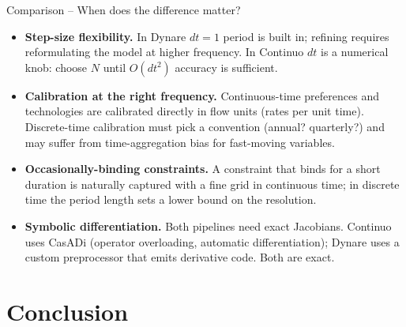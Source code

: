 \documentclass[11pt,aspectratio=169]{beamer}
\begin{document}
\begin{frame}{Comparison -- When does the difference matter?}

\begin{itemize}

\item \textbf{Step-size flexibility.} In Dynare $dt=1$ period is
  built in; refining requires reformulating the model at higher
  frequency. In Continuo $dt$ is a numerical knob: choose
  $N$ until $O(dt^2)$ accuracy is sufficient.\newline

\item \textbf{Calibration at the right frequency.} Continuous-time
  preferences and technologies are calibrated directly in flow units
  (rates per unit time). Discrete-time calibration must pick a
  convention (annual? quarterly?) and may suffer from time-aggregation
  bias for fast-moving variables.\newline

\item \textbf{Occasionally-binding constraints.} A constraint that
  binds for a short duration is naturally captured with a fine
  grid in continuous time; in discrete time the period length sets a
  lower bound on the resolution.\newline

\item \textbf{Symbolic differentiation.} Both pipelines need exact
  Jacobians. Continuo uses CasADi (operator overloading,
  automatic differentiation); Dynare uses a custom preprocessor that
  emits derivative code. Both are exact.

\end{itemize}

\end{frame}

\section{Conclusion}
\end{document}
